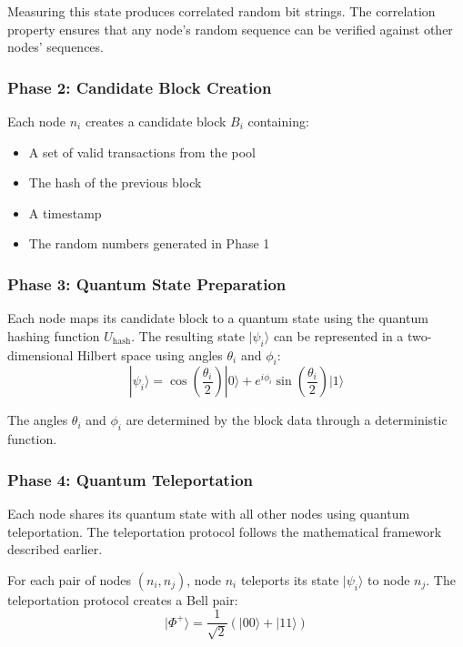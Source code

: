 \documentclass[11pt,a4paper]{article}
\begin{document}
Measuring this state produces correlated random bit strings. The correlation property ensures that any node's random sequence can be verified against other nodes' sequences.

\subsubsection{Phase 2: Candidate Block Creation}
Each node $n_i$ creates a candidate block $B_i$ containing:
\begin{itemize}
    \item A set of valid transactions from the pool
    \item The hash of the previous block
    \item A timestamp
    \item The random numbers generated in Phase 1
\end{itemize}

\subsubsection{Phase 3: Quantum State Preparation}
Each node maps its candidate block to a quantum state using the quantum hashing function $U_{\text{hash}}$. The resulting state $|\psi_i\rangle$ can be represented in a two-dimensional Hilbert space using angles $\theta_i$ and $\phi_i$:
\begin{equation}
|\psi_i\rangle = \cos\left(\frac{\theta_i}{2}\right)|0\rangle + e^{i\phi_i}\sin\left(\frac{\theta_i}{2}\right)|1\rangle
\end{equation}

The angles $\theta_i$ and $\phi_i$ are determined by the block data through a deterministic function.

\subsubsection{Phase 4: Quantum Teleportation}
Each node shares its quantum state with all other nodes using quantum teleportation. The teleportation protocol follows the mathematical framework described earlier.

For each pair of nodes $(n_i, n_j)$, node $n_i$ teleports its state $|\psi_i\rangle$ to node $n_j$. The teleportation protocol creates a Bell pair:
\begin{equation}
|\Phi^+\rangle = \frac{1}{\sqrt{2}}(|00\rangle + |11\rangle)
\end{equation}
\end{document}
